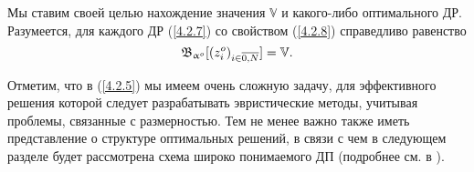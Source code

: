 Мы ставим своей целью нахождение значения $\mathbb{V}$
и какого-либо оптимального ДР.
Разумеется, для каждого ДР (\ref{4.2.7})
со свойством (\ref{4.2.8}) справедливо равенство
$$
  \mathfrak{B}_{\al^o}[(z_i^o)_{i\in\ov{0,N}}]  = \mathbb{V}
  .
$$

Отметим, что в (\ref{4.2.5}) мы имеем очень сложную задачу,
для эффективного решения которой следует разрабатывать эвристические методы,
учитывая проблемы, связанные с размерностью.
Тем не менее важно также
иметь представление о структуре оптимальных решений,
в связи с чем в следующем разделе будет рассмотрена схема широко понимаемого ДП
(подробнее см. в \cite{Cha3`,Cha11`,Cha12`}).
